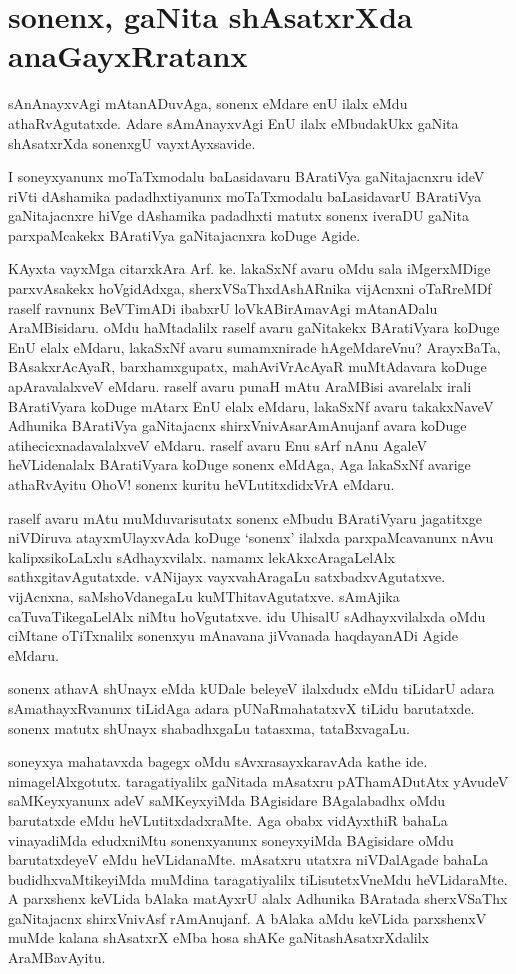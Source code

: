 \chapter{sonenx, gaNita shAsatxrXda anaGayxRratanx}

sAnAnayxvAgi mAtanADuvAga, sonenx eMdare enU ilalx eMdu athaRvAgutatxde. Adare sAmAnayxvAgi EnU ilalx eMbudakUkx gaNita shAsatxrXda sonenxgU vayxtAyxsavide.

I soneyxyanunx moTaTxmodalu baLasidavaru BAratiVya gaNitajacnxru ideV riVti dAshamika padadhxtiyanunx moTaTxmodalu baLasidavarU BAratiVya gaNitajacnxre hiVge dAshamika padadhxti matutx sonenx iveraDU gaNita parxpaMcakekx BAratiVya gaNitajacnxra koDuge Agide.

KAyxta vayxMga citarxkAra Arf. ke. lakaSxNf avaru oMdu sala iMgerxMDige parxvAsakekx hoVgidAdxga, sherxVSaThxdAshARnika vijAcnxni oTaRreMDf raself ravnunx BeVTimADi ibabxrU loVkABirAmavAgi mAtanADalu AraMBisidaru. oMdu haMtadalilx raself avaru gaNitakekx BAratiVyara koDuge EnU elalx eMdaru, lakaSxNf avaru sumamxnirade \-hAgeMdareVnu? ArayxBaTa, BAsakxrAcAyaR, barxhamxgupatx, mahAviVrAcAyaR muMtAdavara koDuge apAravalalxveV eMdaru. raself avaru punaH mAtu AraMBisi avarelalx irali BAratiVyara koDuge mAtarx EnU elalx eMdaru, lakaSxNf avaru takakxNaveV Adhunika BAratiVya gaNitajacnx shirxVnivAsarAmAnujanf avara koDuge atihecicxnadavalalxveV \-eMdaru. raself avaru Enu sArf nAnu AgaleV heVLidenalalx BAratiVyara koDuge \-sonenx eMdAga, Aga lakaSxNf avarige athaRvAyitu OhoV! sonenx kuritu heVLutitxdidxVrA eMdaru.

raself avaru mAtu muMduvarisutatx sonenx eMbudu BAratiVyaru jagatitxge niVDiruva atayxmUlayxvAda koDuge `sonenx' ilalxda parxpaMcavanunx nAvu kalipxsikoLaLxlu sAdhayxvilalx. namamx lekAkxcAragaLelAlx sathxgitavAgutatxde. vANijayx vayxvahAragaLu satxbadxvAgutatxve. vijAcnxna, saMshoVdanegaLu kuMThitavAgutatxve. sAmAjika caTuvaTikegaLelAlx niMtu hoVgutatxve. idu UhisalU sAdhayxvilalxda oMdu ciMtane oTiTxnalilx sonenxyu mAnavana jiVvanada haqdayanADi Agide eMdaru. 

sonenx athavA shUnayx eMda kUDale beleyeV ilalxdudx eMdu tiLidarU adara sAmathayxRvanunx tiLidAga adara pUNaRmahatatxvX tiLidu barutatxde. sonenx matutx shUnayx shabadhxgaLu tatasxma, tataBxvagaLu.

soneyxya mahatavxda bagegx oMdu sAvxrasayxkaravAda kathe ide. nimagelAlxgotutx. taragatiyalilx gaNitada mAsatxru pAThamADutAtx yAvudeV saMKeyxyanunx adeV saMKeyxyiMda BAgisidare BAgalabadhx oMdu barutatxde eMdu heVLutitxdadxraMte. Aga obabx \-vidAyxthiR bahaLa vinayadiMda edudxniMtu sonenxyanunx soneyxyiMda BAgisidare oMdu barutatxdeyeV eMdu heVLidanaMte. mAsatxru utatxra niVDalAgade bahaLa \-budidhxvaMtikeyiMda muMdina taragatiyalilx tiLisutetxVneMdu heVLidaraMte. A parxshenx keVLida bAlaka matAyxrU alalx Adhunika BAratada sherxVSaThx gaNitajacnx shirxVnivAsf rAmAnujanf. A bAlaka aMdu keVLida parxshenxV muMde kalana shAsatxrX eMba hosa shAKe gaNitashAsatxrXdalilx \-AraMBavAyitu.

